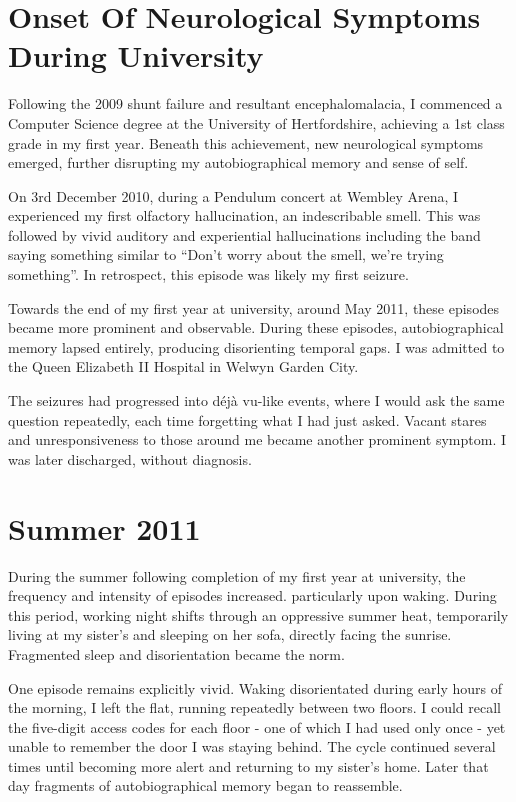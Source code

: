 \documentclass{article}
\begin{document}
\section*{Onset Of Neurological Symptoms During University}
Following the 2009 shunt failure and resultant encephalomalacia, I commenced a Computer Science degree at the University of Hertfordshire, achieving a 1st class grade in my first year. Beneath this achievement, new neurological symptoms emerged, further disrupting my autobiographical memory and sense of self.

On 3rd December 2010, during a Pendulum concert at Wembley Arena, I experienced my first olfactory hallucination, an indescribable smell. This was followed by vivid auditory and experiential hallucinations including the band saying something similar to “Don’t worry about the smell, we’re trying something”. In retrospect, this episode was likely my first seizure.

Towards the end of my first year at university, around May 2011, these episodes became more prominent and observable. During these episodes, autobiographical memory lapsed entirely, producing disorienting temporal gaps. I was admitted to the Queen Elizabeth II Hospital in Welwyn Garden City.

The seizures had progressed into déjà vu-like events, where I would ask the same question repeatedly, each time forgetting what I had just asked. Vacant stares and unresponsiveness to those around me became another prominent symptom. I was later discharged, without diagnosis.

\section*{Summer 2011}
During the summer following completion of my first year at university, the frequency and intensity of episodes increased. particularly upon waking. During this period, working night shifts through an oppressive summer heat, temporarily living at my sister’s and sleeping on her sofa, directly facing the sunrise. Fragmented sleep and disorientation became the norm.

One episode remains explicitly vivid. Waking disorientated during early hours of the morning, I left the flat, running repeatedly between two floors. I could recall the five-digit access codes for each floor - one of which I had used only once - yet unable to remember the door I was staying behind. The cycle continued several times until becoming more alert and returning to my sister's home. Later that day fragments of autobiographical memory began to reassemble.
\end{document}
